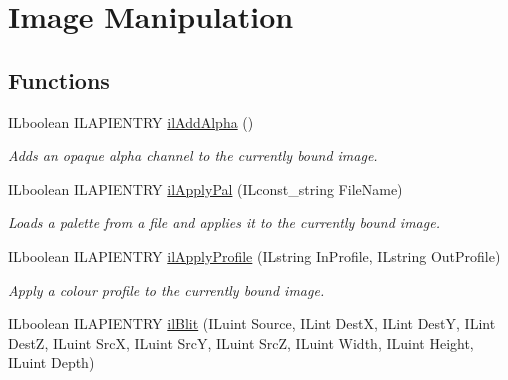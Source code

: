 \hypertarget{group__image__manip}{\section{Image Manipulation}
\label{group__image__manip}
}
\subsection*{Functions}
\begin{DoxyCompactItemize}
\item 
I\+Lboolean I\+L\+A\+P\+I\+E\+N\+T\+R\+Y \hyperlink{group__image__manip_ga0e950cae1c2b697137d8e39a56a2602a}{il\+Add\+Alpha} ()
\begin{DoxyCompactList}\small\item\em Adds an opaque alpha channel to the currently bound image. \end{DoxyCompactList}\item 
\hypertarget{group__image__manip_ga014c750459309c1df11cd535b6440786}{I\+Lboolean I\+L\+A\+P\+I\+E\+N\+T\+R\+Y \hyperlink{group__image__manip_ga014c750459309c1df11cd535b6440786}{il\+Apply\+Pal} (I\+Lconst\+\_\+string File\+Name)}\label{group__image__manip_ga014c750459309c1df11cd535b6440786}

\begin{DoxyCompactList}\small\item\em Loads a palette from a file and applies it to the currently bound image. \end{DoxyCompactList}\item 
I\+Lboolean I\+L\+A\+P\+I\+E\+N\+T\+R\+Y \hyperlink{group__image__manip_gad41bda3bd56aa5df16c34b98c8a50224}{il\+Apply\+Profile} (I\+Lstring In\+Profile, I\+Lstring Out\+Profile)
\begin{DoxyCompactList}\small\item\em Apply a colour profile to the currently bound image. \end{DoxyCompactList}\item 
\hypertarget{group__image__manip_ga5733e9e8126ebeea814e1b0f5bb9be44}{I\+Lboolean I\+L\+A\+P\+I\+E\+N\+T\+R\+Y \hyperlink{group__image__manip_ga5733e9e8126ebeea814e1b0f5bb9be44}{il\+Blit} (I\+Luint Source, I\+Lint Dest\+X, I\+Lint Dest\+Y, I\+Lint Dest\+Z, I\+Luint Src\+X, I\+Luint Src\+Y, I\+Luint Src\+Z, I\+Luint Width, I\+Luint Height, I\+Luint Depth)}\label{group__image__manip_ga5733e9e8126ebeea814e1b0f5bb9be44}


\end{DoxyCompactItemize}
